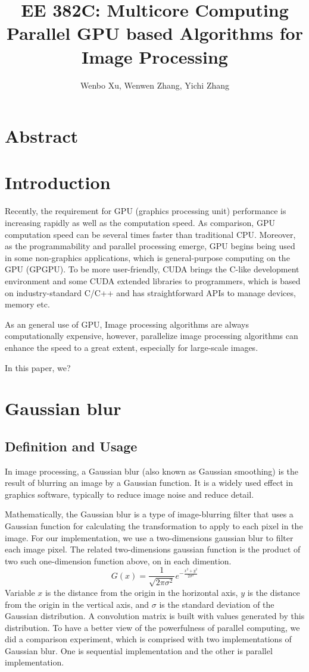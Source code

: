 \documentclass[journal,12pt,onecolumn,draftclsnofoot]{ieeeconf}  %
\author{Wenbo Xu, Wenwen Zhang, Yichi Zhang}
\title{
	EE 382C: Multicore Computing \protect\\
	\Large \bf Parallel GPU based Algorithms for Image Processing
}
\begin{document}
\maketitle
\thispagestyle{empty}
\pagestyle{empty}


\section{Abstract}
  

\section{Introduction}
Recently, the requirement for GPU (graphics processing unit) performance is increasing rapidly as well as the computation speed. As comparison, GPU computation speed can be several times faster than traditional CPU. Moreover, as the programmability and parallel processing emerge\cite{1}, GPU begins being used in some non-graphics applications, which is general-purpose computing on the GPU (GPGPU). To be more user-friendly, CUDA brings the C-like development 
environment and some CUDA extended libraries to programmers, which is based on industry-standard C/C++ and has straightforward APIs to manage devices, memory etc.

As an general use of GPU, Image processing algorithms are always computationally expensive, however, parallelize image processing algorithms can enhance the speed to a great extent, especially for large-scale images.

In this paper, we?

\section{Gaussian blur}
\subsection{Definition and Usage}
In image processing, a Gaussian blur (also known as Gaussian smoothing) is the result of blurring an image by a Gaussian function. It is a widely used effect in graphics software, typically to reduce image noise and reduce detail. 

Mathematically, the Gaussian blur is a type of image-blurring filter that uses a Gaussian function for calculating the transformation to apply to each pixel in the image.  For our implementation, we use a two-dimensions gaussian blur to filter each image pixel. The related two-dimensions gaussian function is the product of two such one-dimension function above, on in each dimention. 
  \[G(x) = \frac{1}{ \sqrt{2 \pi   \sigma ^{2} } } e^{ -\frac{ x^{2} +  y^{2}}{2  \sigma ^{2} }}\]
 Variable $x$ is the distance from the origin in the horizontal axis, $y$ is the distance from the origin in the vertical axis, and $\sigma$ is the standard deviation of the Gaussian distribution. A convolution matrix is built with values generated by this distribution.  
 To have a better view of the powerfulness of parallel computing, we did a comparison experiment, which is comprised with two implementations of Gaussian blur. One is sequential implementation and the other is parallel implementation. 
\end{document}
